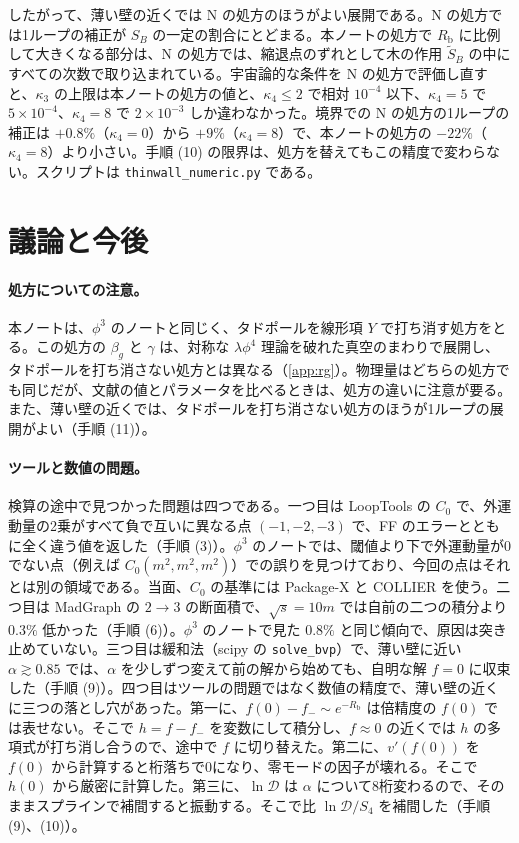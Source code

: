 \documentclass[a4paper,10pt]{ltjsarticle}
\begin{document}
したがって、薄い壁の近くでは N の処方のほうがよい展開である。N の処方では1ループの補正が $S_B$ の一定の割合にとどまる。本ノートの処方で $R_{\mathrm b}$ に比例して大きくなる部分は、N の処方では、縮退点のずれとして木の作用 $\tilde S_B$ の中にすべての次数で取り込まれている。宇宙論的な条件を N の処方で評価し直すと、$\kappa_3$ の上限は本ノートの処方の値と、$\kappa_4\le2$ で相対 $10^{-4}$ 以下、$\kappa_4=5$ で $5\times10^{-4}$、$\kappa_4=8$ で $2\times10^{-3}$ しか違わなかった。境界での N の処方の1ループの補正は $+0.8\%$（$\kappa_4=0$）から $+9\%$（$\kappa_4=8$）で、本ノートの処方の $-22\%$（$\kappa_4=8$）より小さい。手順 (10) の限界は、処方を替えてもこの精度で変わらない。スクリプトは \texttt{thinwall\_numeric.py} である。

\FloatBarrier
\section{議論と今後}\label{sec:discussion}

\paragraph{処方についての注意。}本ノートは、$\phi^3$ のノートと同じく、タドポールを線形項 $Y$ で打ち消す処方をとる。この処方の $\beta_g$ と $\gamma$ は、対称な $\lambda\phi^4$ 理論を破れた真空のまわりで展開し、タドポールを打ち消さない処方とは異なる（\ref{app:rg}）。物理量はどちらの処方でも同じだが、文献の値とパラメータを比べるときは、処方の違いに注意が要る。また、薄い壁の近くでは、タドポールを打ち消さない処方のほうが1ループの展開がよい（手順 (11)）。

\paragraph{ツールと数値の問題。}検算の途中で見つかった問題は四つである。一つ目は LoopTools の $C_0$ で、外運動量の2乗がすべて負で互いに異なる点 $(-1,-2,-3)$ で、FF のエラーとともに全く違う値を返した（手順 (3)）。$\phi^3$ のノートでは、閾値より下で外運動量が0でない点（例えば $C_0(m^2,m^2,m^2)$）での誤りを見つけており、今回の点はそれとは別の領域である。当面、$C_0$ の基準には Package-X と COLLIER を使う。二つ目は MadGraph の $2\to3$ の断面積で、$\sqrt s=10m$ では自前の二つの積分より $0.3\%$ 低かった（手順 (6)）。$\phi^3$ のノートで見た $0.8\%$ と同じ傾向で、原因は突き止めていない。三つ目は緩和法（scipy の \texttt{solve\_bvp}）で、薄い壁に近い $\alpha\gtrsim0.85$ では、$\alpha$ を少しずつ変えて前の解から始めても、自明な解 $f=0$ に収束した（手順 (9)）。四つ目はツールの問題ではなく数値の精度で、薄い壁の近くに三つの落とし穴があった。第一に、$f(0)-f_-\sim e^{-R_{\mathrm b}}$ は倍精度の $f(0)$ では表せない。そこで $h=f-f_-$ を変数にして積分し、$f\approx0$ の近くでは $h$ の多項式が打ち消し合うので、途中で $f$ に切り替えた。第二に、$v'(f(0))$ を $f(0)$ から計算すると桁落ちで0になり、零モードの因子が壊れる。そこで $h(0)$ から厳密に計算した。第三に、$\ln\mathcal D$ は $\alpha$ について8桁変わるので、そのままスプラインで補間すると振動する。そこで比 $\ln\mathcal D/S_4$ を補間した（手順 (9)、(10)）。
\end{document}
